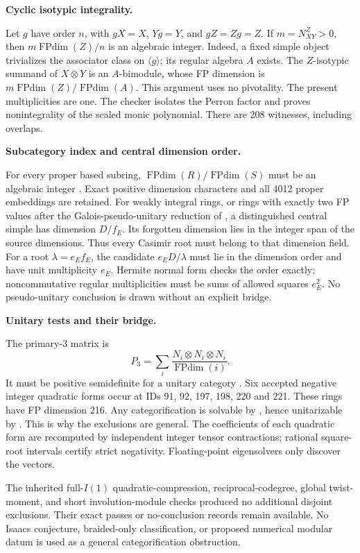 \documentclass[11pt]{article}
\newcommand{\FPdim}{\operatorname{FPdim}}\newcommand{\VEC}{\operatorname{Vec}}
\begin{document}
\textbf{Cyclic isotypic integrality.}\par
Let $g$ have order $n$, with $gX=X$, $Yg=Y$, and $gZ=Zg=Z$. If $m=N_{XY}^Z>0$,
then $m\FPdim(Z)/n$ is an algebraic integer. Indeed, a fixed simple object trivializes
the associator class on $\langle g\rangle$; its regular algebra $A$ exists.
The $Z$-isotypic summand of $X\otimes Y$ is an $A$-bimodule, whose FP dimension is
$m\FPdim(Z)/\FPdim(A)$. This argument uses no pivotality. The present multiplicities
are one. The checker isolates the Perron factor and proves nonintegrality of the
scaled monic polynomial. There are 208 witnesses, including overlaps.

\textbf{Subcategory index and central dimension order.}\par
For every proper based subring, $\FPdim(R)/\FPdim(S)$ must be an algebraic integer
\cite{EGNO}. Exact positive dimension characters and all 4012 proper embeddings are
retained. For weakly integral rings, or rings with exactly two FP values after the
Galois-pseudo-unitary reduction of \cite[Lemma 3.1]{Schopieray}, a distinguished central
simple has dimension $D/f_E$. Its forgotten dimension lies in the integer span of the
source dimensions. Thus every Casimir root must belong to that dimension field.
For a root $\lambda=e_Ef_E$, the candidate $e_ED/\lambda$ must lie in the dimension
order and have unit multiplicity $e_E$. Hermite normal form checks the order exactly;
noncommutative regular multiplicities must be sums of allowed squares $e_E^2$.
No pseudo-unitary conclusion is drawn without an explicit bridge.

\textbf{Unitary tests and their bridge.}\par
The primary-3 matrix is
\[
P_3=\sum_i\frac{N_i\otimes N_i\otimes N_i}{\FPdim(i)}.
\]
It must be positive semidefinite for a unitary category \cite{HLPW}. Six accepted
negative integer quadratic forms occur at IDs 91, 92, 197, 198, 220 and 221. These
rings have FP dimension 216. Any categorification is solvable by
\cite[Theorem 1.6]{ENOsolv}, hence unitarizable by \cite[Theorem 5.20]{GHR}.
This is why the exclusions are general. The coefficients of each quadratic form are
recomputed by independent integer tensor contractions; rational square-root intervals
certify strict negativity. Floating-point eigensolvers only discover the vectors.

The inherited full-$I(1)$ quadratic-compression, reciprocal-codegree, global twist-moment,
and short involution-module checks produced no additional disjoint exclusions.
Their exact passes or no-conclusion records remain available. No Isaacs conjecture,
braided-only classification, or proposed numerical modular datum is used as a general
categorification obstruction.
\end{document}
